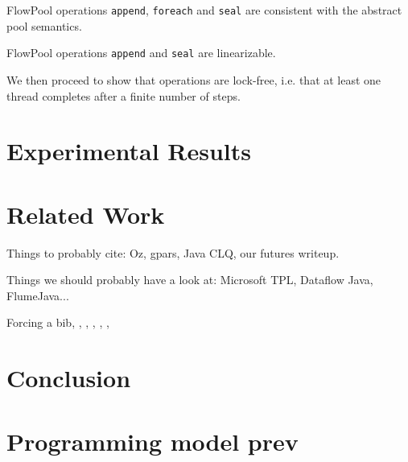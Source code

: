 \documentclass[runningheads,a4paper]{llncs}
\begin{document}
\begin{theorem}[Safety]
FlowPool operations \verb=append=, \verb=foreach=
and \verb=seal= are consistent with the abstract pool semantics.
\end{theorem}


\begin{theorem}
FlowPool operations \verb=append= and \verb=seal= are linearizable.
\end{theorem}

We then proceed to show that operations are lock-free, i.e. that at
least one thread completes after a finite number of steps.


\section{Experimental Results}

\section{Related Work}
Things to probably cite: Oz, gpars, Java CLQ, our futures writeup.

Things we should probably have a look at: Microsoft TPL, Dataflow
Java, FlumeJava...

Forcing a bib, \cite{bowman:reasoning}, \cite{braams:babel}, \cite{clark:pct}, \cite{herlihy:methodology}, \cite{Lamport:LaTeX}, \cite{salas:calculus}
\section{Conclusion}

\section{Programming model prev}
\end{document}
